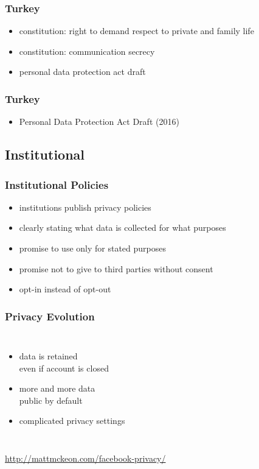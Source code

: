 \documentclass[dvipsnames]{beamer}
\theoremstyle{plain}
\begin{document}
\begin{frame}
  \frametitle{Turkey}

  \begin{itemize}
    \item constitution: right to demand respect to private and family life
    \item constitution: communication secrecy
    \item personal data protection act draft
  \end{itemize}
\end{frame}

\begin{frame}
  \frametitle{Turkey}

  \begin{itemize}
    \item Personal Data Protection Act Draft (2016)
  \end{itemize}
\end{frame}

\subsection{Institutional}

\begin{frame}
  \frametitle{Institutional Policies}

  \begin{itemize}
    \item institutions publish privacy policies
    \item clearly stating what data is collected for what purposes
    \item promise to use only for stated purposes
    \item promise not to give to third parties without consent

    \medskip
    \item opt-in instead of opt-out
  \end{itemize}
\end{frame}

\begin{frame}
  \frametitle{Privacy Evolution}

  \begin{columns}

    \begin{itemize}
      \item data is retained\\
        even if account is closed
      \item more and more data\\
        public by default
      \item complicated privacy settings
    \end{itemize}
  \end{columns}

  \medskip
  \tiny{\url{http://mattmckeon.com/facebook-privacy/}}\\
\end{frame}
\end{document}
